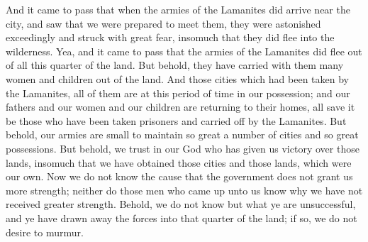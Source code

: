 And it came to pass that when the armies of the Lamanites did arrive near the city, and saw that we were prepared to meet them, they were astonished exceedingly and struck with great fear, insomuch that they did flee into the wilderness.
\bverse \iffalse Yea, and it came to pass that the armies of the Lamanites did flee out of all this quarter of the land. But behold, they have carried with them many women and children out of the land. \fi
Yea, and it came to pass that the armies of the Lamanites did flee out of all this quarter of the land. But behold, they have carried with them many women and children out of the land.
\bverse \iffalse And those cities which had been taken by the Lamanites, all of them are at this period of time in our possession; and our fathers and our women and our children are returning to their homes, all save it be those who have been taken prisoners and carried off by the Lamanites. \fi
And those cities which had been taken by the Lamanites, all of them are at this period of time in our possession; and our fathers and our women and our children are returning to their homes, all save it be those who have been taken prisoners and carried off by the Lamanites.
\bverse \iffalse But behold, our armies are small to maintain so great a number of cities and so great possessions. \fi
But behold, our armies are small to maintain so great a number of cities and so great possessions.
\bverse \iffalse But behold, we trust in our God who has given us victory over those lands, insomuch that we have obtained those cities and those lands, which were our own. \fi
But behold, we trust in our God who has given us victory over those lands, insomuch that we have obtained those cities and those lands, which were our own.
\bverse \iffalse Now we do not know the cause that the government does not grant us more strength; neither do those men who came up unto us know why we have not received greater strength. \fi
Now we do not know the cause that the government does not grant us more strength; neither do those men who came up unto us know why we have not received greater strength.
\bverse \iffalse Behold, we do not know but what ye are unsuccessful, and ye have drawn away the forces into that quarter of the land; if so, we do not desire to murmur. \fi
Behold, we do not know but what ye are unsuccessful, and ye have drawn away the forces into that quarter of the land; if so, we do not desire to murmur.
\bverse \iffalse And if it is not so, behold, we fear that there is some faction in the government, that they do not send more men to our assistance; for we know that they are more numerous than that which they have sent. \fi
